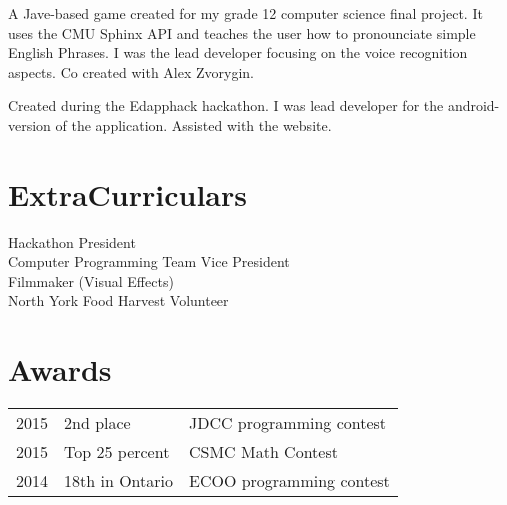 \documentclass[]{DavidTsenterResume}
\begin{document}
\begin{minipage}[t]{0.66\textwidth}
A Jave-based game created for my grade 12 computer science final project. It uses the CMU Sphinx API and teaches the user how to pronounciate simple English Phrases. I was the lead developer focusing on the voice recognition aspects. Co created with Alex Zvorygin.\\
\sectionsep

Created during the Edapphack hackathon. I was lead developer for the android-version of the application. Assisted with the website. 
\sectionsep
\section{ExtraCurriculars}
\textbullet{} Hackathon President \\
\textbullet{} Computer Programming Team Vice President \\
\textbullet{} Filmmaker (Visual Effects) \\
\textbullet{} North York Food Harvest Volunteer \\
\sectionsep
\sectionsep


\section{Awards} 
\begin{tabular}{rll}
2015	     & 2nd place  & JDCC programming contest\\
2015     & Top 25 percent& CSMC Math Contest\\
2014	     & 18th in Ontario  & ECOO programming contest\\

\end{tabular}
\sectionsep

\end{minipage} 
\end{document}

